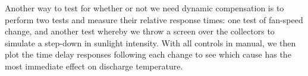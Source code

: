 \vskip 10pt

Another way to test for whether or not we need dynamic compensation is to perform two tests and measure their relative response times: one test of fan-speed change, and another test whereby we throw a screen over the collectors to simulate a step-down in sunlight intensity.  With all controls in manual, we then plot the time delay responses following each change to see which cause has the most immediate effect on discharge temperature.




